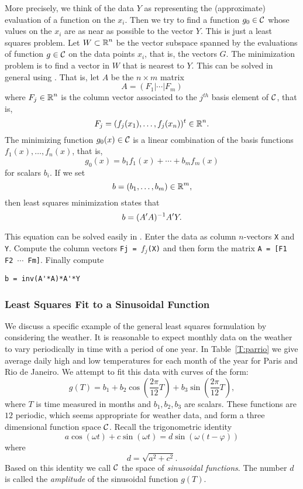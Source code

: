 \documentclass{ximera}
\begin{document}
More precisely, we think of the data $Y$ as representing the (approximate)
evaluation of a function on the $x_i$.  Then we try to find a function
$g_0\in{\cal C}$ whose values on the $x_i$ are as near as possible to
the vector $Y$.  This is just a least squares problem.  Let $W\subset\mbox{$\Bbb{R}$}^n$ be
the vector subspace spanned by the evaluations of function $g\in{\cal C}$ on
the data points $x_i$, that is, the vectors $G$.  The minimization problem
is to find a vector in $W$ that is nearest to $Y$.  This can be solved in
general using .  That is, let $A$ be the $n\times m$
matrix
\[
A = (F_1|\cdots|F_m)
\]
where $F_j\in\mbox{$\Bbb{R}$}^n$ is the column vector associated to the $j^{th}$ basis
element of ${\cal C}$, that is,
\[
F_j = (f_j(x_1),\ldots,f_j(x_n))^t\in\mbox{$\Bbb{R}$}^n.
\]
The minimizing function $g_0(x)\in{\cal C}$ is a linear combination of the
basis functions $f_1(x),\ldots,f_n(x)$, that is,
\[
g_0(x) = b_1f_1(x) + \cdots + b_mf_m(x)
\]
for scalars $b_i$.  If we set
\[
b = (b_1,\ldots,b_m)\in\mbox{$\Bbb{R}$}^m,
\]
then least squares minimization states that
\begin{equation}  \label{E:LSFG}
b = (A'A)^{-1} A'Y.
\end{equation}

This equation can be solved easily in \Matlabp.  Enter the data as column
$n$-vectors {\tt X} and {\tt Y}.  Compute the column vectors
{\tt Fj = $f_j$(X)} and then form the matrix {\tt A = [F1 F2 $\cdots$ Fm]}.
Finally compute
\begin{verbatim}
b = inv(A'*A)*A'*Y
\end{verbatim}


\subsubsection*{Least Squares Fit to a Sinusoidal Function}

We discuss a specific example of the general least squares formulation by
considering the weather.  It is reasonable to expect monthly data on the
weather to vary periodically in time with a period of one year.  In
Table~\ref{T:parrio} we give average daily high and low temperatures for
each month of the year for Paris and Rio de Janeiro.  We attempt to fit this
data with curves of the form:
\[
g(T) = b_1 + b_2\cos\left(\frac{2\pi}{12}T\right) +
b_3\sin\left(\frac{2\pi}{12}T\right),
\]
where $T$ is time measured in months and $b_1,b_2,b_3$ are scalars.  These
functions are $12$ periodic, which seems appropriate for weather data, and
form a three dimensional function space ${\cal C}$.  Recall the trigonometric
identity
\[
a\cos(\omega t) + c\sin(\omega t) = d\sin(\omega(t-\varphi))
\]
where
\[
d = \sqrt{a^2+c^2}.
\]
Based on this identity we call ${\cal C}$ the space of {\em sinusoidal
functions\/}.  The number $d$ is called
the {\em amplitude\/} of the
sinusoidal function $g(T)$.
\end{document}
